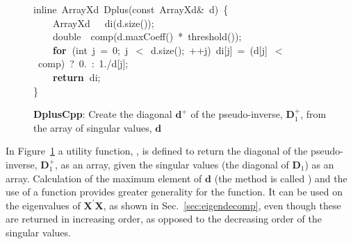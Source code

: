 \documentclass[shortnames,article]{jss}
\newcommand{\hlstd}[1]{\textcolor[rgb]{0,0,0}{#1}}
\newcommand{\hlnum}[1]{\textcolor[rgb]{0,0,0}{#1}}
\newcommand{\hlopt}[1]{\textcolor[rgb]{0,0,0}{#1}}
\newcommand{\hlkwa}[1]{\textcolor[rgb]{0.61,0.13,0.93}{\bf{#1}}}
\newcommand{\hlkwb}[1]{\textcolor[rgb]{0.13,0.54,0.13}{#1}}
\newcommand{\hlkwc}[1]{\textcolor[rgb]{0,0,1}{#1}}
\newcommand{\hlkwd}[1]{\textcolor[rgb]{0,0,0}{#1}}
\begin{document}
\begin{figure}[htb]
  \noindent
  \ttfamily
  \hlstd{}\hlkwc{inline\ }\hlstd{ArrayXd\ }\hlkwd{Dplus}\hlstd{}\hlopt{(}\hlstd{}\hlkwb{const\ }\hlstd{ArrayXd}\hlopt{\&\ }\hlstd{d}\hlopt{)\ \{}\hspace*{\fill}\\
  \hlstd{}\hlstd{\ \ \ \ }\hlstd{ArrayXd}\hlstd{\ \ \ }\hlstd{}\hlkwd{di}\hlstd{}\hlopt{(}\hlstd{d}\hlopt{.}\hlstd{}\hlkwd{size}\hlstd{}\hlopt{());}\hspace*{\fill}\\
  \hlstd{}\hlstd{\ \ \ \ }\hlstd{}\hlkwb{double}\hlstd{\ \ }\hlkwb{}\hlstd{}\hlkwd{comp}\hlstd{}\hlopt{(}\hlstd{d}\hlopt{.}\hlstd{}\hlkwd{maxCoeff}\hlstd{}\hlopt{()\ {*}\ }\hlstd{}\hlkwd{threshold}\hlstd{}\hlopt{());}\hspace*{\fill}\\
  \hlstd{}\hlstd{\ \ \ \ }\hlstd{}\hlkwa{for\ }\hlstd{}\hlopt{(}\hlstd{}\hlkwb{int\ }\hlstd{j\ }\hlopt{=\ }\hlstd{}\hlnum{0}\hlstd{}\hlopt{;\ }\hlstd{j\ }\hlopt{$<$\ }\hlstd{d}\hlopt{.}\hlstd{}\hlkwd{size}\hlstd{}\hlopt{();\ ++}\hlstd{j}\hlopt{)\ }\hlstd{di}\hlopt{{[}}\hlstd{j}\hlopt{{]}\ =\ (}\hlstd{d}\hlopt{{[}}\hlstd{j}\hlopt{{]}\ $<$\ }\hlstd{comp}\hlopt{)\ }\hlstd{?\ }\hlnum{0}\hlstd{}\hlopt{.\ :\ }\hlstd{}\hlnum{1}\hlstd{}\hlopt{./}\hlstd{d}\hlopt{{[}}\hlstd{j}\hlopt{{]};}\hspace*{\fill}\\
  \hlstd{}\hlstd{\ \ \ \ }\hlstd{}\hlkwa{return\ }\hlstd{di}\hlopt{;}\hspace*{\fill}\\
  \hlstd{}\hlopt{\}}\hlstd{}\hspace*{\fill}\\
  \mbox{}
  \normalfont
  \normalsize
  \caption{\textbf{DplusCpp}: Create the diagonal $\bm d^+$ of the pseudo-inverse, $\bm D_1^+$, from the array of singular values, $\bm d$}
  \label{Dplus}
\end{figure}

In Figure~\ref{Dplus} a utility function, , is defined to
return the diagonal of the pseudo-inverse, $\bm D_1^+$, as an array,
given the singular values (the diagonal of $\bm D_1$) as an array.
Calculation of the maximum element of $\bm d$ (the method is called
) and the use of a  function
provides greater generality for the function.  It can be used on the
eigenvalues of $\bm X^\prime\bm X$, as shown in
Sec.~\ref{sec:eigendecomp}, even though these are returned in
increasing order, as opposed to the decreasing order of the singular
values.
\end{document}
